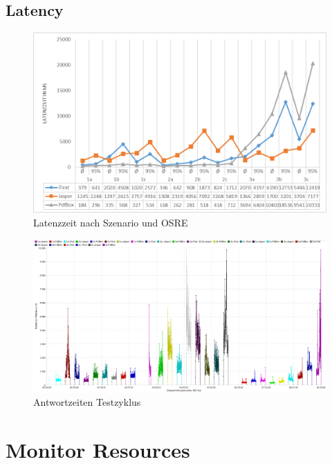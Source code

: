 \documentclass[main.tex]{subfiles}
\begin{document}
\subsection{Latency}
\begin{figure}[h]
\includegraphics[width=\textwidth]{mainpart/4_analyse_img/LatenzzeitSzen.png}
 \caption{Latenzzeit nach Szenario und OSRE}
 \label{figure:latencySzenario}
\end{figure}



\begin{figure}[h]
\includegraphics[width=\textwidth]{mainpart/4_analyse_img/ResponseLatenciesOverTime.png}
 \caption{Antwortzeiten Testzyklus}
 \label{figure:latencyTestcycle}
\end{figure}






\section{Monitor Resources}
\end{document}
